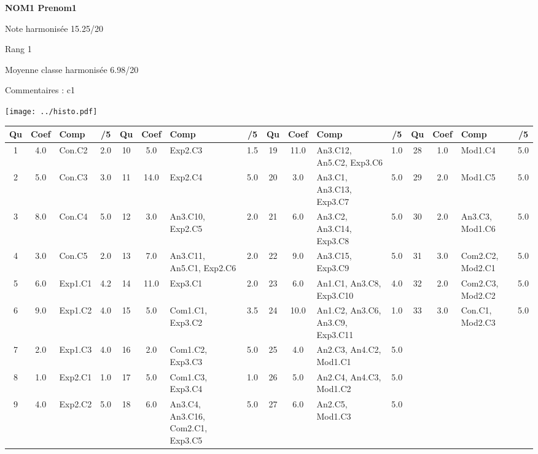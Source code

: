 \begin{minipage}[c]{.45\linewidth} 
\Large \textbf{\textsf{NOM1 Prenom1}} 
 
 \normalsize Note harmonisée 15.25/20 
 
Rang 1
 
Moyenne classe harmonisée 6.98/20 
 
Commentaires : 
c1 
\end{minipage}\hfill 
\begin{minipage}[c]{.45\linewidth}  
\begin{center}
\texttt{[image: ../histo.pdf]} 
\end{center}
\end{minipage}
\footnotesize 
\begin{center} 
\begin{tabular}{|c|c|m{1cm}|c||c|c|m{1cm}|c||c|c|m{1cm}|c||c|c|m{1cm}|c|} 
\hline \textbf{Qu} & \textbf{Coef} & \textbf{Comp} & \textbf{/5} & \textbf{Qu} & \textbf{Coef} & \textbf{Comp} & \textbf{/5} & \textbf{Qu} & \textbf{Coef} & \textbf{Comp} & \textbf{/5} & \textbf{Qu} & \textbf{Coef} & \textbf{Comp} & \textbf{/5} \\ 
\hline 
\hline 
1 & 4.0 & Con.C2 & 2.0 & 10 & 5.0 & Exp2.C3 & 1.5 & 19 & 11.0 & An3.C12, An5.C2, Exp3.C6 & 1.0 & 28 & 1.0 & Mod1.C4 & 5.0 \\ \hline 
2 & 5.0 & Con.C3 & 3.0 & 11 & 14.0 & Exp2.C4 & 5.0 & 20 & 3.0 & An3.C1, An3.C13, Exp3.C7 & 5.0 & 29 & 2.0 & Mod1.C5 & 5.0 \\ \hline 
3 & 8.0 & Con.C4 & 5.0 & 12 & 3.0 & An3.C10, Exp2.C5 & 2.0 & 21 & 6.0 & An3.C2, An3.C14, Exp3.C8 & 5.0 & 30 & 2.0 & An3.C3, Mod1.C6 & 5.0 \\ \hline 
4 & 3.0 & Con.C5 & 2.0 & 13 & 7.0 & An3.C11, An5.C1, Exp2.C6 & 2.0 & 22 & 9.0 & An3.C15, Exp3.C9 & 5.0 & 31 & 3.0 & Com2.C2, Mod2.C1 & 5.0 \\ \hline 
5 & 6.0 & Exp1.C1 & 4.2 & 14 & 11.0 & Exp3.C1 & 2.0 & 23 & 6.0 & An1.C1, An3.C8, Exp3.C10 & 4.0 & 32 & 2.0 & Com2.C3, Mod2.C2 & 5.0 \\ \hline 
6 & 9.0 & Exp1.C2 & 4.0 & 15 & 5.0 & Com1.C1, Exp3.C2 & 3.5 & 24 & 10.0 & An1.C2, An3.C6, An3.C9, Exp3.C11 & 1.0 & 33 & 3.0 & Con.C1, Mod2.C3 & 5.0 \\ \hline 
7 & 2.0 & Exp1.C3 & 4.0 & 16 & 2.0 & Com1.C2, Exp3.C3 & 5.0 & 25 & 4.0 & An2.C3, An4.C2, Mod1.C1 & 5.0 &  &  &  &  \\ \hline 

8 & 1.0 & Exp2.C1 & 1.0 & 17 & 5.0 & Com1.C3, Exp3.C4 & 1.0 & 26 & 5.0 & An2.C4, An4.C3, Mod1.C2 & 5.0 &  &  &  &  \\ \hline 

9 & 4.0 & Exp2.C2 & 5.0 & 18 & 6.0 & An3.C4, An3.C16, Com2.C1, Exp3.C5 & 5.0 & 27 & 6.0 & An2.C5, Mod1.C3 & 5.0 &  &  &  &  \\ \hline 

\end{tabular} 
\end{center} 
\normalsize 
 

